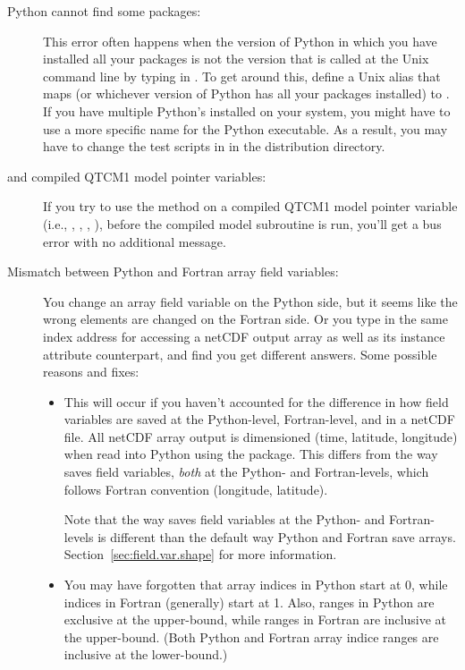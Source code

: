 \begin{description}
\item[Python cannot find some packages:]
	This error often happens when the version of Python in which
	you have installed all your packages is not the version that
	is called at the Unix command line by typing in .
	To get around this, 
        define a Unix alias
        that maps  (or whichever version of Python
	has all your packages installed) to .  If you
	have multiple Python's installed on your system, you might
	have to use a more specific name for the Python executable.
	As a result, you may have to change the test scripts in
	 in the  distribution directory.

\item[ and compiled QTCM1 model pointer
	variables:]
	If you try to use the  method on a compiled
	QTCM1 model pointer variable 
	(i.e., , , , ),
	 before the compiled
	model  subroutine is run, you'll get a bus error
	with no additional message.

\item[Mismatch between Python and Fortran array field variables:]
	You change an array field variable on the Python side, but
	it seems like the wrong elements are changed on the Fortran
	side.  Or you type in the same index address for accessing a
	 netCDF output array as well as its 
	instance attribute counterpart, and find you get different
	answers.  Some possible reasons and fixes:

	\begin{itemize}
	\item This will occur if you haven't accounted for the
		difference in how field variables are saved at the
		Python-level, Fortran-level, and in a netCDF file.
		All netCDF array output is dimensioned (time,
		latitude, longitude) when read into Python using
		the  package.  This differs from
		the way  saves field variables, \emph{both}
		at the Python- and Fortran-levels, which follows
		Fortran convention (longitude, latitude).

		Note that the way  saves field variables
		at the Python- and Fortran-levels is different than
		the default way Python and Fortran save arrays.
		Section~\ref{sec:field.var.shape} for more information.

	\item You may have forgotten that array indices in Python start at
		0, while indices in Fortran (generally) start at 1.
		Also, ranges in Python are exclusive at the upper-bound,
		while ranges in Fortran are inclusive at the upper-bound.
		(Both Python and Fortran array indice ranges are inclusive
		at the lower-bound.)


\end{itemize}
\end{description}
